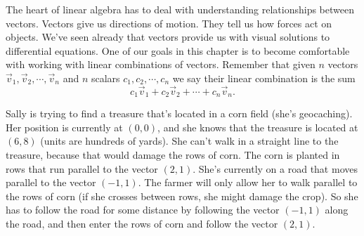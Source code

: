 The heart of linear algebra has to deal with understanding relationships between vectors.  Vectors give us directions of motion.  They tell us how forces act on objects. We've seen already that vectors provide us with visual solutions to differential equations. One of our goals in this chapter is to become comfortable with working with linear combinations of vectors.  
Remember that given $n$ vectors  $\vec v_1, \vec v_2,\cdots,\vec v_n$ and $n$ scalars $c_1, c_2, \cdots, c_n$ we say their linear combination is the sum $$c_1\vec v_1+c_2\vec v_2+\cdots+c_n\vec v_n.$$

\begin{problem}\label{sally in corn field with 2 directions}
Sally is trying to find a treasure that's located in a corn field (she's geocaching). 
Her position is currently at $(0,0)$, and she knows that the treasure is located at $(6,8)$ (units are hundreds of yards). 
She can't walk in a straight line to the treasure, because that would damage the rows of corn.  
The corn is planted in rows that run parallel to the vector $(2,1)$.  
She's currently on a road that moves parallel to the vector $(-1,1)$. 
The farmer will only allow her to walk parallel to the rows of corn (if she crosses between rows, she might damage the crop).  
So she has to follow the road for some distance by following the vector $(-1,1)$ along the road, and then enter the rows of corn and follow the vector $(2,1)$.

\end{problem}
